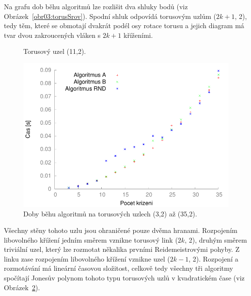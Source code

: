 Na grafu dob běhu algoritmů lze rozlišit dva shluky bodů (viz Obrázek~\ref{obr03:torusSrov}). Spodní shluk odpovídá torusovým uzlům ($2k+1$, 2), tedy těm, které se obmotají dvakrát podél osy rotace torusu a jejich diagram má tvar dvou zakroucených vláken s $2k+1$ kříženími.

\begin{figure}[h]\centering
{}
\caption{Torusový uzel (11,2).}
\label{obr04:torus11}
\end{figure}

\begin{figure}[p]\centering
\includegraphics{../img/torus2}
\caption{Doby běhu algoritmů na torusových uzlech (3,2) až (35,2).}
\label{obr03:torus2}
\end{figure}

Všechny stěny tohoto uzlu jsou ohraničené pouze dvěma hranami. Rozpojením libovolného křížení jedním směrem vznikne torusový link ($2k$, 2), druhým směrem triviální uzel, který lze rozmotat někalika prvními Reidemeistrovými pohyby. Z linku zase rozpojením libovolného křížení vznikne uzel ($2k-1$, 2). Rozpojení a rozmotávání má lineární časovou složitost, celkově tedy všechny tři algoritmy spočítají Jonesův polynom tohoto typu torusových uzlů v kvadratickém čase (viz Obrázek~\ref{obr03:torus2}).

